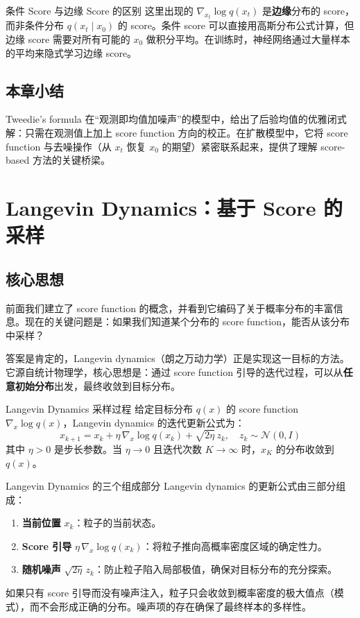 \documentclass[a4paper]{article}
\begin{document}
\begin{warningbox}{条件 Score 与边缘 Score 的区别}
这里出现的 $\nabla_{x_t} \log q(x_t)$ 是\textbf{边缘}分布的 score，而非条件分布 $q(x_t \mid x_0)$ 的 score。条件 score 可以直接用高斯分布公式计算，但边缘 score 需要对所有可能的 $x_0$ 做积分平均。在训练时，神经网络通过大量样本的平均来隐式学习边缘 score。
\end{warningbox}

\subsection{本章小结}

Tweedie's formula 在``观测即均值加噪声''的模型中，给出了后验均值的优雅闭式解：只需在观测值上加上 score function 方向的校正。在扩散模型中，它将 score function 与去噪操作（从 $x_t$ 恢复 $x_0$ 的期望）紧密联系起来，提供了理解 score-based 方法的关键桥梁。

\section{Langevin Dynamics：基于 Score 的采样}

\subsection{核心思想}

前面我们建立了 score function 的概念，并看到它编码了关于概率分布的丰富信息。现在的关键问题是：如果我们知道某个分布的 score function，能否从该分布中采样？

答案是肯定的，Langevin dynamics（朗之万动力学）正是实现这一目标的方法。它源自统计物理学，核心思想是：通过 score function 引导的迭代过程，可以从\textbf{任意初始分布}出发，最终收敛到目标分布。

\begin{importantbox}{Langevin Dynamics 采样过程}
给定目标分布 $q(x)$ 的 score function $\nabla_x \log q(x)$，Langevin dynamics 的迭代更新公式为：
$$x_{k+1} = x_k + \eta\, \nabla_x \log q(x_k) + \sqrt{2\eta}\, z_k, \quad z_k \sim \mathcal{N}(0, I)$$
其中 $\eta > 0$ 是步长参数。当 $\eta \to 0$ 且迭代次数 $K \to \infty$ 时，$x_K$ 的分布收敛到 $q(x)$。
\end{importantbox}

\begin{knowledgebox}{Langevin Dynamics 的三个组成部分}
Langevin dynamics 的更新公式由三部分组成：
\begin{enumerate}
    \item \textbf{当前位置} $x_k$：粒子的当前状态。
    \item \textbf{Score 引导} $\eta\, \nabla_x \log q(x_k)$：将粒子推向高概率密度区域的确定性力。
    \item \textbf{随机噪声} $\sqrt{2\eta}\, z_k$：防止粒子陷入局部极值，确保对目标分布的充分探索。
\end{enumerate}
如果只有 score 引导而没有噪声注入，粒子只会收敛到概率密度的极大值点（模式），而不会形成正确的分布。噪声项的存在确保了最终样本的多样性。
\end{knowledgebox}
\end{document}
